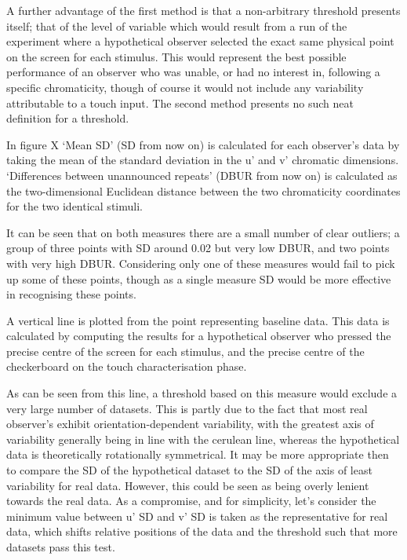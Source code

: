 A further advantage of the first method is that a non-arbitrary threshold presents itself; that of the level of variable which would result from a run of the experiment where a hypothetical observer selected the exact same physical point on the screen for each stimulus. This would represent the best possible performance of an observer who was unable, or had no interest in, following a specific chromaticity, though of course it would not include any variability attributable to a touch input. The second method presents no such neat definition for a threshold.


In figure X `Mean SD' (SD from now on) is calculated for each observer's data by taking the mean of the standard deviation in the u' and v' chromatic dimensions. `Differences between unannounced repeats' (DBUR from now on) is calculated as the two-dimensional Euclidean distance between the two chromaticity coordinates for the two identical stimuli.

It can be seen that on both measures there are a small number of clear outliers; a group of three points with SD around 0.02 but very low DBUR, and two points with very high DBUR. Considering only one of these measures would fail to pick up some of these points, though as a single measure SD would be more effective in recognising these points.

A vertical line is plotted from the point representing baseline data. This data is calculated by computing the results for a hypothetical observer who pressed the precise centre of the screen for each stimulus, and the precise centre of the checkerboard on the touch characterisation phase. 

As can be seen from this line, a threshold based on this measure would exclude a very large number of datasets. This is partly due to the fact that most real observer's exhibit orientation-dependent variability, with the greatest axis of variability generally being in line with the cerulean line, whereas the hypothetical data is theoretically rotationally symmetrical. It may be more appropriate then to compare the SD of the hypothetical dataset to the SD of the axis of least variability for real data. However, this could be seen as being overly lenient towards the real data. As a compromise, and for simplicity, let's consider the minimum value between u' SD and v' SD is taken as the representative for real data, which shifts relative positions of the data and the threshold such that more datasets pass this test. 

